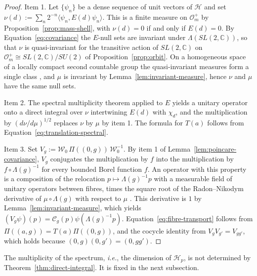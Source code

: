 \begin{proof}
	Item 1. Let $\{\psi_n\}$ be a dense sequence of unit vectors of $\mathcal{H}$ and set $\nu(d):=\sum_n2^{-n}\langle\psi_n,E(d)\psi_n\rangle$. This is a finite measure on $\mathcal{O}_m^+$ by Proposition~\ref{prop:mass-shell}, with $\nu(d)=0$ if and only if $E(d)=0$. By Equation~\eqref{eq:covariance} the $E$-null sets are invariant under $\Lambda(SL(2,\mathbb{C}))$, so that $\nu$ is quasi-invariant for the transitive action of $SL(2,\mathbb{C})$ on $\mathcal{O}_m^+\cong SL(2,\mathbb{C})/SU(2)$ of Proposition~\ref{prop:orbit}. On a homogeneous space of a locally compact second countable group the quasi-invariant measures form a single class \cite[TODO-location]{TODO-Mackey1958}, and $\mu$ is invariant by Lemma~\ref{lem:invariant-measure}, hence $\nu$ and $\mu$ have the same null sets.
	
	Item 2. The spectral multiplicity theorem \cite[TODO-location]{TODO-Mor18} applied to $E$ yields a unitary operator onto a direct integral over $\nu$ intertwining $E(d)$ with $\chi_d$, and the multiplication by $(d\nu/d\mu)^{1/2}$ replaces $\nu$ by $\mu$ by item 1. The formula for $T(a)$ follows from Equation~\eqref{eq:translation-spectral}.
	
	Item 3. Set $V_g:=\mathcal{W}_0\,\Pi((0,g))\,\mathcal{W}_0^{-1}$. By item 1 of Lemma~\ref{lem:poincare-covariance}, $V_g$ conjugates the multiplication by $f$ into the multiplication by $f\circ\Lambda(g)^{-1}$ for every bounded Borel function $f$. An operator with this property is a composition of the relocation $p\mapsto\Lambda(g)^{-1}p$ with a measurable field of unitary operators between fibres, times the square root of the Radon--Nikodym derivative of $\mu\circ\Lambda(g)$ with respect to $\mu$ \cite[TODO-location]{TODO-Mackey1958}. This derivative is $1$ by Lemma~\ref{lem:invariant-measure}, which yields $(V_g\psi)(p)=\mathcal{C}_g(p)\psi(\Lambda(g)^{-1}p)$. Equation~\eqref{eq:fibre-transport} follows from $\Pi((a,g))=T(a)\Pi((0,g))$, and the cocycle identity from $V_gV_{g'}=V_{gg'}$, which holds because $(0,g)(0,g')=(0,gg')$.
\end{proof}

\noindent The multiplicity of the spectrum, \textit{i.e.}, the dimension of $\mathcal{H}_p$, is not determined by Theorem~\ref{thm:direct-integral}. It is fixed in the next subsection.

